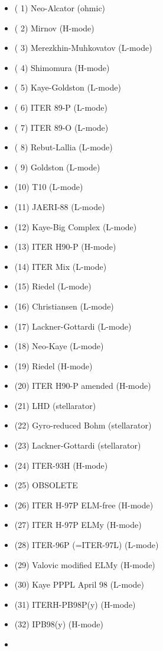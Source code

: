 \documentclass[]{article}
\providecommand{\tightlist}{%
  \setlength{\itemsep}{0pt}\setlength{\parskip}{0pt}}
\begin{document}
\begin{itemize}
  \begin{itemize}
  \tightlist
  \item
    ( 1) Neo-Alcator (ohmic)
  \item
    ( 2) Mirnov (H-mode)
  \item
    ( 3) Merezkhin-Muhkovatov (L-mode)
  \item
    ( 4) Shimomura (H-mode)
  \item
    ( 5) Kaye-Goldston (L-mode)
  \item
    ( 6) ITER 89-P (L-mode)
  \item
    ( 7) ITER 89-O (L-mode)
  \item
    ( 8) Rebut-Lallia (L-mode)
  \item
    ( 9) Goldston (L-mode)
  \item
    (10) T10 (L-mode)
  \item
    (11) JAERI-88 (L-mode)
  \item
    (12) Kaye-Big Complex (L-mode)
  \item
    (13) ITER H90-P (H-mode)
  \item
    (14) ITER Mix (L-mode)
  \item
    (15) Riedel (L-mode)
  \item
    (16) Christiansen (L-mode)
  \item
    (17) Lackner-Gottardi (L-mode)
  \item
    (18) Neo-Kaye (L-mode)
  \item
    (19) Riedel (H-mode)
  \item
    (20) ITER H90-P amended (H-mode)
  \item
    (21) LHD (stellarator)
  \item
    (22) Gyro-reduced Bohm (stellarator)
  \item
    (23) Lackner-Gottardi (stellarator)
  \item
    (24) ITER-93H (H-mode)
  \item
    (25) OBSOLETE
  \item
    (26) ITER H-97P ELM-free (H-mode)
  \item
    (27) ITER H-97P ELMy (H-mode)
  \item
    (28) ITER-96P (=ITER-97L) (L-mode)
  \item
    (29) Valovic modified ELMy (H-mode)
  \item
    (30) Kaye PPPL April 98 (L-mode)
  \item
    (31) ITERH-PB98P(y) (H-mode)
  \item
    (32) IPB98(y) (H-mode)
  \item

\end{itemize}
\end{itemize}
\end{document}
